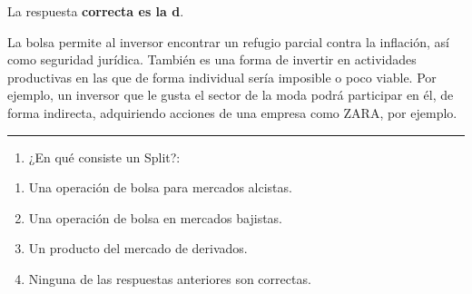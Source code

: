 \documentclass[
  letterpaper,
  DIV=11,
  numbers=noendperiod]{scrreprt}
\providecommand{\tightlist}{%
  \setlength{\itemsep}{0pt}\setlength{\parskip}{0pt}}\usepackage{longtable,booktabs,array}
\begin{document}
\begin{tcolorbox}[enhanced jigsaw, left=2mm, opacityback=0, colback=white, breakable, arc=.35mm, bottomrule=.15mm, rightrule=.15mm, toprule=.15mm, leftrule=.75mm, colframe=quarto-callout-tip-color-frame]
\begin{minipage}[t]{5.5mm}
\textcolor{quarto-callout-tip-color}{\faLightbulb}
\end{minipage}%
\begin{minipage}[t]{\textwidth - 5.5mm}

La respuesta \textbf{correcta es la d}.

La bolsa permite al inversor encontrar un refugio parcial contra la
inflación, así como seguridad jurídica. También es una forma de invertir
en actividades productivas en las que de forma individual sería
imposible o poco viable. Por ejemplo, un inversor que le gusta el sector
de la moda podrá participar en él, de forma indirecta, adquiriendo
acciones de una empresa como ZARA, por ejemplo.

\end{minipage}%
\end{tcolorbox}

\begin{center}\rule{0.5\linewidth}{0.5pt}\end{center}

\begin{enumerate}
\def\labelenumi{\arabic{enumi}.}
\setcounter{enumi}{22}
\tightlist
\item
  ¿En qué consiste un Split?:
\end{enumerate}

\begin{enumerate}
\def\labelenumi{\alph{enumi})}
\item
  Una operación de bolsa para mercados alcistas.
\item
  Una operación de bolsa en mercados bajistas.
\item
  Un producto del mercado de derivados.
\item
  Ninguna de las respuestas anteriores son correctas.
\end{enumerate}
\end{document}
